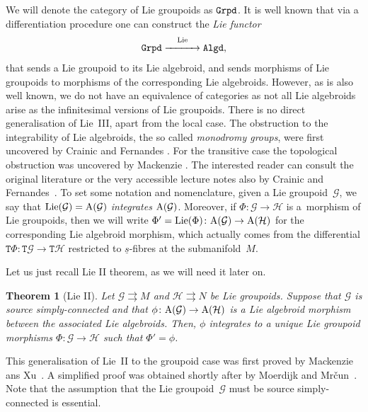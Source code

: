 \documentclass[pdftex]{sigma}
\newcommand{\rmA}{\textnormal{A}}
\newcommand{\Lie}{\textnormal{Lie}}
\newcommand{\catname}[1]{\textnormal{\texttt{#1}}}
\def\sT{{\mathtt T}}
\numberwithin{equation}{section}
\newtheorem{Theorem}{Theorem}[section]
\begin{document}
We will denote the category of Lie groupoids as $\catname{Grpd}$. It is well known that via a dif\/fe\-ren\-tia\-tion procedure one can construct the \emph{Lie functor}
\begin{gather*}
\catname{Grpd} \stackrel{\Lie}{\xrightarrow{\hspace*{30pt}}} \catname{Algd},
\end{gather*}
that sends a Lie groupoid to its Lie algebroid, and sends morphisms of Lie groupoids to morphisms of the corresponding Lie algebroids. However, as is also well known, we do not have an equivalence of categories as not all Lie  algebroids arise as the inf\/initesimal versions of Lie groupoids.  There is no direct generalisation of Lie~III,  apart from the local case. The obstruction to the integrability of Lie algebroids, the so called \emph{monodromy groups},  were f\/irst uncovered by Crainic and Fernandes \cite{Crainic:2003}.  For the transitive case the topological obstruction was uncovered by Mackenzie \cite{Mackenzie:1987}.  The interested reader can consult the original literature or the very accessible lecture notes also by Crainic and  Fernandes~\cite{Crainic:2011}. To set some notation and nomenclature, given a  Lie groupoid~$\mathcal{G}$, we say that $\Lie(\mathcal{G}) = \rmA(\mathcal{G})$ \emph{integrates}  $\rmA(\mathcal{G})$. Moreover, if $\Phi\colon \mathcal{G} \rightarrow \mathcal{H}$ is a~morphism of Lie groupoids, then we will write $\Phi' = \Lie(\Phi) \colon  \rmA(\mathcal{G}) \rightarrow \rmA(\mathcal{H})$ for the corresponding Lie algebroid morphism,  which actually comes from the dif\/ferential $\sT\Phi\colon \sT\mathcal{G} \rightarrow \sT\mathcal{H}$ restricted to $\underline{s}$-f\/ibres at the submanifold~$M$.

Let  us just recall Lie II theorem, as we will need it later on.

\begin{Theorem}[Lie II] \label{thm:integration morphisms}
Let $\mathcal{G} \rightrightarrows M$ and $\mathcal{H}\rightrightarrows N$ be Lie groupoids. Suppose that $\mathcal{G}$ is source simply-connected and that $\phi\colon \rmA(\mathcal{G}) \rightarrow \rmA(\mathcal{H})$ is a Lie algebroid morphism between the associated Lie algebroids. Then, $\phi$ integrates to a unique Lie groupoid morphisms $\Phi\colon \mathcal{G} \rightarrow \mathcal{H}$ such that $\Phi' = \phi$.
\end{Theorem}

This generalisation  of Lie~II to the groupoid case was f\/irst proved by Mackenzie ans Xu~\cite{Mackenzie:2000}. A simplif\/ied proof was obtained shortly after by Moerdijk and  Mr\v{c}un~\cite{Moerdijk:2002}.  Note that the assumption that the Lie groupoid~$\mathcal{G}$ must be source simply-connected is essential.
\end{document}
